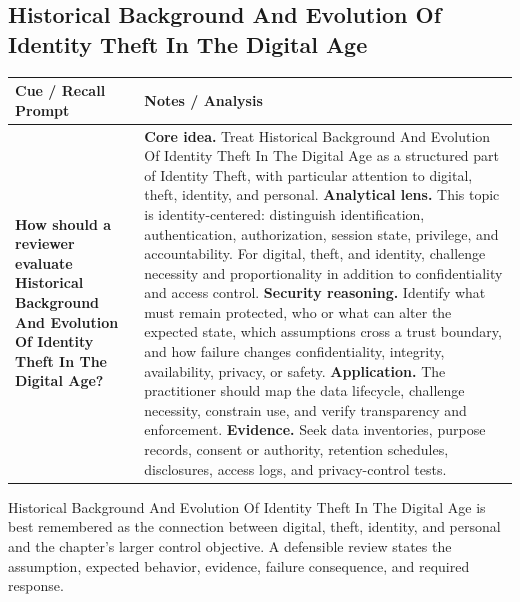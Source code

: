 \documentclass[11pt]{article}
\newcommand{\CornellHeader}{%
\rowcolor{Navy}\color{white}\bfseries Cue / Recall Prompt & \color{white}\bfseries Notes / Analysis\\\hline}
\newcommand{\CornellRow}[2]{%
\cellcolor{CueGray}\RaggedRight\textbf{#1} & \RaggedRight #2\\\hline}
\begin{document}
\subsection*{Historical Background And Evolution Of Identity Theft In The Digital Age}
\begin{longtable}{>{\RaggedRight\arraybackslash}p{}|>{\RaggedRight\arraybackslash}p{}}
\CornellHeader
\CornellRow{How should a reviewer evaluate Historical Background And Evolution Of Identity Theft In The Digital Age?}{\textbf{Core idea.} Treat Historical Background And Evolution Of Identity Theft In The Digital Age as a structured part of Identity Theft, with particular attention to digital, theft, identity, and personal. \textbf{Analytical lens.} This topic is identity-centered: distinguish identification, authentication, authorization, session state, privilege, and accountability. For digital, theft, and identity, challenge necessity and proportionality in addition to confidentiality and access control. \textbf{Security reasoning.} Identify what must remain protected, who or what can alter the expected state, which assumptions cross a trust boundary, and how failure changes confidentiality, integrity, availability, privacy, or safety. \textbf{Application.} The practitioner should map the data lifecycle, challenge necessity, constrain use, and verify transparency and enforcement. \textbf{Evidence.} Seek data inventories, purpose records, consent or authority, retention schedules, disclosures, access logs, and privacy-control tests.}
\end{longtable}
\begin{topicsummary}
Historical Background And Evolution Of Identity Theft In The Digital Age is best remembered as the connection between digital, theft, identity, and personal and the chapter's larger control objective. A defensible review states the assumption, expected behavior, evidence, failure consequence, and required response.
\end{topicsummary}
\end{document}
